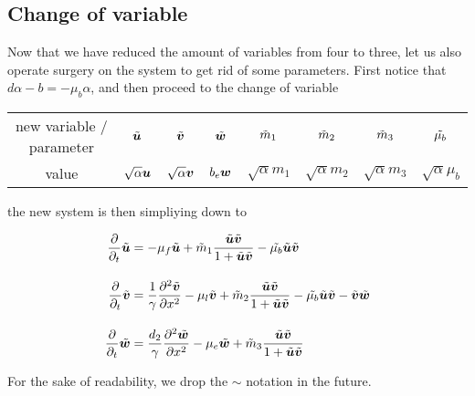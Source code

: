 \subsection{Change of variable}

Now that we have reduced the amount of variables from four to three, let us also operate surgery on the system to get rid of some parameters. First notice that $d\alpha - b = -\mu_b \alpha$, and then proceed to the change of variable 

\begin{center}
\begin{tabular}{cccccccc}
	new variable / parameter & $\Tilde{\bm{u}}$ & $ \Tilde{\bm{v}}$ & $ \Tilde{\bm{w}}$ & $\Tilde{m}_1 $ & $\Tilde{m}_2$ & $\Tilde{m}_3$ & $\Tilde{\mu_b}$  \\[0.8em]
	value & $\sqrt{\alpha} \bm{u}$ & $\sqrt{\alpha} \bm{v}$ & $b_e \bm{w}$ & $\sqrt{\alpha} m_1$ & $\sqrt{\alpha} m_2$ & $\sqrt{\alpha} m_3$ &  $\sqrt{\alpha} \mu_b $
\end{tabular}
\end{center}

the new system is then simpliying down to

\begin{align}
	 \dfrac{\partial}{\partial_t} \Tilde{\bm{u}} &= -\mu_f \Tilde{\bm{u}} + \Tilde{m}_1 \dfrac{ \Tilde{\bm{u}} \Tilde{\bm{v}}}{1 +  \Tilde{\bm{u}} \Tilde{\bm{v}}} - \Tilde{\mu_b} \Tilde{\bm{u}} \Tilde{ \bm{v}}  \notag \\[1em]
	\dfrac{\partial}{\partial_t} \Tilde{\bm{v}} &= \dfrac{1}{\gamma} \frac{\partial^2 \Tilde{\bm{v}}}{\partial x^2} - \mu_l  \Tilde{\bm{v}} +\Tilde{ m}_2 \dfrac{ \Tilde{\bm{u}} \Tilde{\bm{v}}}{1 +  \Tilde{\bm{u}}\Tilde{\bm{v}}} - \Tilde{\mu_b} \Tilde{ \bm{u}} \Tilde{ \bm{v}} - \Tilde{\bm{v}} \Tilde{\bm{w}}  \\[1em]
	\dfrac{\partial}{\partial_t} \Tilde{\bm{w}} &= \dfrac{d_2}{\gamma} \frac{\partial^2 \Tilde{\bm{w}}}{\partial x^2} - \mu_e\Tilde{ \bm{w}} + \Tilde{m}_3 \dfrac{\Tilde{\bm{u}}\Tilde{\bm{v}}}{1 + \Tilde{\bm{u}}\Tilde{\bm{v}}} \notag
\end{align}

For the sake of readability, we drop the $\sim$ notation in the future.



